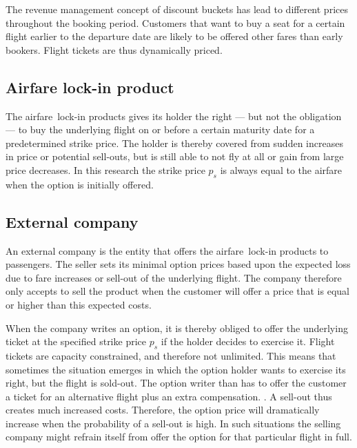 The revenue management concept of discount buckets has lead to different prices throughout the booking period. Customers that want to buy a seat for a certain flight earlier to the departure date are likely to be offered other fares than early bookers. Flight tickets are thus dynamically priced.

\subsection{Airfare lock-in product}
The airfare~lock-in products gives its holder the right --- but not the obligation --- to buy the underlying flight on or before a certain maturity date for a predetermined strike price. The holder is thereby covered from sudden increases in price or potential sell-outs, but is still able to not fly at all or gain from large price decreases. In this research the strike price $p_s$ is always equal to the airfare when the option is initially offered.

\subsection{External company}
An external company is the entity that offers the airfare~lock-in products to passengers. The seller sets its minimal option prices based upon the expected loss due to fare increases or sell-out of the underlying flight. The company therefore only accepts to sell the product when the customer will offer a price that is equal or higher than this expected costs.

When the company writes an option, it is thereby obliged to offer the underlying ticket at the specified strike price $p_s$ if the holder decides to exercise it. Flight tickets are capacity constrained, and therefore not unlimited. This means that sometimes the situation emerges in which the option holder wants to exercise its right, but the flight is sold-out. The option writer than has to offer the customer a ticket for an alternative flight plus an extra compensation. . A sell-out thus creates much increased costs. Therefore, the option price will dramatically increase when the probability of a sell-out is high. In such situations the selling company might refrain itself from offer the option for that particular flight in full.

